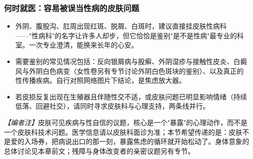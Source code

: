 \subsubsection{何时就医：容易被误当性病的皮肤问题}

\begin{itemize}
\item 外阴、腹股沟、肛周出现红斑、脱屑、白斑时，建议直接挂皮肤性病科——"性病科"的名字让许多人却步，但它恰恰是鉴别"是不是性病"最专业的科室。一次专业澄清，能换来长年的心安。
\item 需要鉴别的常见情况包括：反向银屑病与股癣、外阴湿疹与接触性皮炎、白癜风与外阴白色病变（女性卷另有专节讨论外阴白色斑块的鉴别）、以及真正的性传播疾病。自行对照网络图片下结论，是焦虑放大器。
\item 若皮损反复出现在生殖器且伴随性交不适，或皮肤问题已明显影响情绪（持续低落、回避社交），请同时寻求皮肤科与心理支持，两条线并行。
\end{itemize}

\noindent\textit{【编者注】}皮肤可见疾病与性自信的议题，核心是一个"暴露"的心理动作，而不是一个皮肤科技术问题。医学信息请以皮肤科面诊为准；本节希望传递的是：皮肤不是爱的入场券，把病说出口的那一刻，暴露焦虑的循环就开始松动了。身体意象的总体讨论见本章前文；残障与身体改变者的亲密议题另有专节。
